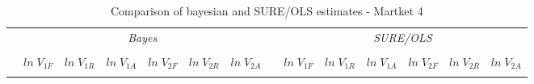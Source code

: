 \begin{table} [H]
\caption{Comparison of bayesian and SURE/OLS estimates - Martket 4}
\label{tbl:mkt4_T_SCOTYORK}
\centering
\begin{tabular}{lrrrrrrrrrrrrr}
  \toprule 
 & \multicolumn{6}{c}{\textit{Bayes}} && \multicolumn{6}{c}{\textit{SURE/OLS}} \\ 
\cline{2-7} \cline{9-14} 
\\[-1.8ex] & $ln \; V_{1F}$ & $ln \; V_{1R}$ & $ln \; V_{1A}$ & $ln \; V_{2F}$ & $ln \; V_{2R}$ & $ln \; V_{2A}$ & & $ln \; V_{1F}$ & $ln \; V_{1R}$ & $ln \; V_{1A}$ & $ln \; V_{2F}$ & $ln \; V_{2R}$ & $ln \; V_{2A}$ \\ 
\hline \\[-1.8ex] 


\end{tabular}
\end{table}
